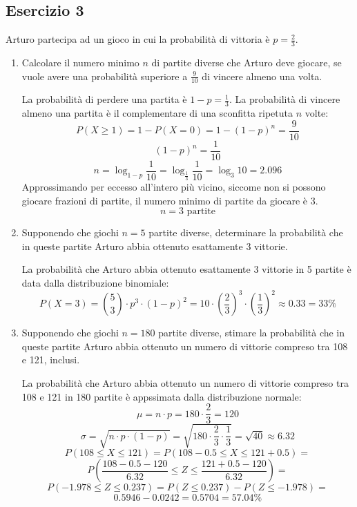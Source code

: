 \documentclass[a4paper]{article}
\theoremstyle{break}
\theoremstyle{break}
\theoremstyle{break}
\theoremstyle{break}
\begin{document}
\subsection{Esercizio 3}
Arturo partecipa ad un gioco in cui la probabilità di vittoria è \( p = \frac{2}{3} \).
\begin{enumerate}
	\item Calcolare il numero minimo \( n \) di partite diverse che Arturo deve giocare,
	      se vuole avere una probabilità superiore a \( \frac{9}{10} \) di vincere almeno una
	      volta.

	      \vspace{1em}
	      La probabilità di perdere una partita è \( 1 - p = \frac{1}{3} \). La probabilità
	      di vincere almeno una partita è il complementare di una sconfitta ripetuta \( n \)
	      volte:
	      \[
		      P(X \ge 1) = 1- P(X = 0) = 1 - (1 - p)^n = \frac{9}{10}
	      \]
	      \[
		      (1 - p)^n = \frac{1}{10}
	      \]
	      \[
		      n = \log_{1-p} \frac{1}{10} = \log_{\frac{1}{3}} \frac{1}{10} = \log_{3}10 = 2.096
	      \]
	      Approssimando per eccesso all'intero più vicino, siccome non si possono giocare
	      frazioni di partite, il numero minimo di partite da giocare è 3.
	      \[
		      n = 3 \text{ partite}
	      \]
	\item Supponendo che giochi \( n = 5 \) partite diverse, determinare la probabilità che
	      in queste partite Arturo abbia ottenuto esattamente 3 vittorie.

	      \vspace{1em}
	      La probabilità che Arturo abbia ottenuto esattamente 3 vittorie in 5 partite è data
	      dalla distribuzione binomiale:
	      \[
		      P(X = 3) = \binom{5}{3} \cdot p^3 \cdot (1-p)^2 =  10 \cdot \left( \frac{2}{3} \right)^3
		      \cdot \left( \frac{1}{3} \right)^2 \approx 0.33 = 33\%
	      \]
	\item Supponendo che giochi \( n = 180 \) partite diverse, stimare la probabilità che
	      in queste partite Arturo abbia ottenuto un numero di vittorie compreso tra 108 e 121,
	      inclusi.

	      \vspace{1em}
	      La probabilità che Arturo abbia ottenuto un numero di vittorie compreso tra 108 e 121
	      in 180 partite è appssimata dalla distribuzione normale:
        \[
          \mu = n \cdot p = 180 \cdot \frac{2}{3} = 120
        \]
        \[
          \sigma = \sqrt{n \cdot p \cdot (1-p)} = \sqrt{180 \cdot \frac{2}{3} \cdot \frac{1}{3}} = \sqrt{40} \approx 6.32
        \]
        \[
          P(108 \le X \le 121) = P(108 - 0.5 \le X \le 121 + 0.5) =
        \] 
        \[
          P(\frac{108 -0.5 -120}{6.32} \le Z \le \frac{121 + 0.5 - 120}{6.32}) =
        \] 
        \[
          P(-1.978 \le Z \le 0.237) = P(Z \le 0.237) - P(Z \le -1.978) = 
        \] 
        \[
          0.5946 - 0.0242 = 0.5704 = 57.04\%
        \] 
\end{enumerate}
\end{document}

